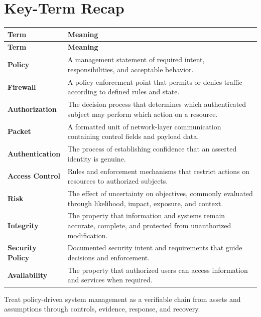 \documentclass[11pt]{article}
\begin{document}
\section*{Key-Term Recap}
\begin{longtable}{>{\RaggedRight\arraybackslash}p{}>{\RaggedRight\arraybackslash}p{}}
\toprule\rowcolor{Navy}\color{white}\textbf{Term} & \color{white}\textbf{Meaning}\\\midrule
\endfirsthead
\toprule\rowcolor{Navy}\color{white}\textbf{Term} & \color{white}\textbf{Meaning}\\\midrule
\endhead
\textbf{Policy} & A management statement of required intent, responsibilities, and acceptable behavior. \\\midrule
\textbf{Firewall} & A policy-enforcement point that permits or denies traffic according to defined rules and state. \\\midrule
\textbf{Authorization} & The decision process that determines which authenticated subject may perform which action on a resource. \\\midrule
\textbf{Packet} & A formatted unit of network-layer communication containing control fields and payload data. \\\midrule
\textbf{Authentication} & The process of establishing confidence that an asserted identity is genuine. \\\midrule
\textbf{Access Control} & Rules and enforcement mechanisms that restrict actions on resources to authorized subjects. \\\midrule
\textbf{Risk} & The effect of uncertainty on objectives, commonly evaluated through likelihood, impact, exposure, and context. \\\midrule
\textbf{Integrity} & The property that information and systems remain accurate, complete, and protected from unauthorized modification. \\\midrule
\textbf{Security Policy} & Documented security intent and requirements that guide decisions and enforcement. \\\midrule
\textbf{Availability} & The property that authorized users can access information and services when required. \\\midrule
\bottomrule
\end{longtable}
\begin{takeawaybox}
Treat policy-driven system management as a verifiable chain from assets and assumptions through controls, evidence, response, and recovery.
\end{takeawaybox}
\end{document}
